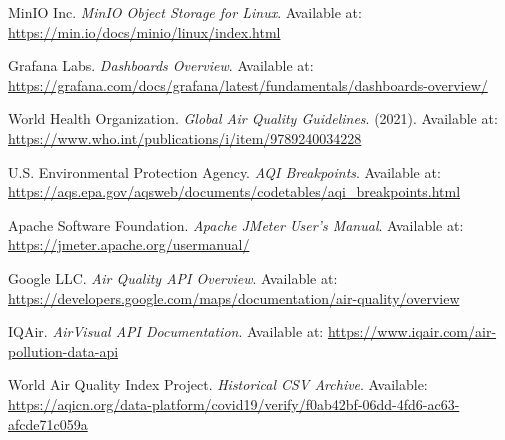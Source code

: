 \begin{thebibliography}{00}
MinIO Inc. \textit{MinIO Object Storage for Linux}. Available at: \url{https://min.io/docs/minio/linux/index.html}

Grafana Labs. \textit{Dashboards Overview}. Available at: \url{https://grafana.com/docs/grafana/latest/fundamentals/dashboards-overview/}

World Health Organization. \textit{Global Air Quality Guidelines}. (2021). Available at: \url{https://www.who.int/publications/i/item/9789240034228}

U.S. Environmental Protection Agency. \textit{AQI Breakpoints}. Available at: \url{https://aqs.epa.gov/aqsweb/documents/codetables/aqi_breakpoints.html}

Apache Software Foundation. \textit{Apache JMeter User's Manual}. Available at: \url{https://jmeter.apache.org/usermanual/}

Google LLC. \textit{Air Quality API Overview}. Available at: \url{https://developers.google.com/maps/documentation/air-quality/overview}

IQAir. \textit{AirVisual API Documentation}. Available at: \url{https://www.iqair.com/air-pollution-data-api}

World Air Quality Index Project. \textit{Historical CSV Archive}. Available: \url{https://aqicn.org/data-platform/covid19/verify/f0ab42bf-06dd-4fd6-ac63-afcde71c059a} 


\end{thebibliography}